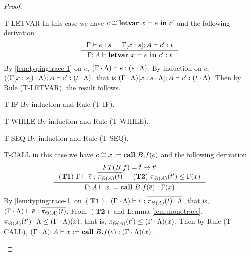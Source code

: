 {{{\begin{proof}
\begin{ProofEnumDesc}
\item[T-LETVAR] %
In this case we have $c \cong \lcLETVAR{x}{e}{c'}$ and the following derivation
\begin{equation*}
\inference
{\Gamma \vdash e : s &
\Gamma[x:s]; A \vdash c' : t }
{\Gamma; A\vdash \lcLETVAR{x}{e}{c'} :  t}
\end{equation*}
By \ref{lem:typingtrace-1} on $e$, $(\Gamma\cdot\trace) \vdash e :  (s\cdot\trace)$.
By induction on $c$, $((\Gamma[x:s])\cdot\trace);A \vdash c' :  (t\cdot\trace)$,
that is $(\Gamma\cdot\trace)[x:s\cdot\trace];A \vdash c' :  (t\cdot\trace)$.
Then by Rule {(T-LETVAR)}, the result follows.

\item[T-IF] By induction and Rule {(T-IF)}.
\item[T-WHILE] By induction and Rule {(T-WHILE)}.
\item[T-SEQ] By induction and Rule {(T-SEQ)}.

\item[T-CALL] in this case we have $c \cong \lcCALL{x}{B.f}{\overline{e}}$ and the following derivation
\begin{equation*}
\inference
{
\FT(B.f) = \overline{t} \xrightarrow{} t'  \\
(\mathbf{T1})~\Gamma \vdash \overline{e} : \overline{\app{t}{\Theta(A)}} &
(\mathbf{T2})~\app{t'}{\Theta(A)}\leq \Gamma(x)
}
{\Gamma; A \vdash \lcCALL{x}{B.f}{\overline{e}} : \Gamma(x)}
\end{equation*}
By \ref{lem:typingtrace-1} on $(\mathbf{T1})$, $(\Gamma\cdot\trace)\vdash \overline{e} : \overline{\app{t}{\Theta(A)}\cdot\trace}$, that is, $(\Gamma\cdot\trace)\vdash \overline{e} : \overline{\app{t}{\Theta(A)}}$.
From $(\mathbf{T2})$ and Lemma \ref{lem:monotrace}, $\app{t'}{\Theta(A)}\cdot\trace \leq (\Gamma\cdot\trace)(x)$, that is, $\app{t'}{\Theta(A)} \leq (\Gamma\cdot\trace)(x)$.
Then by Rule {(T-CALL)}, $(\Gamma\cdot\trace);A\vdash \lcCALL{x}{B.f}{\overline{e}}  : (\Gamma\cdot\trace)(x)$.



\end{ProofEnumDesc}
\end{proof}}}}
